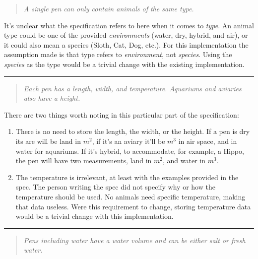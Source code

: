 \documentclass[english,a4paper,]{report}
\begin{document}
\begin{quote}
\emph{A single pen can only contain animals of the same type.}
\end{quote}

It's unclear what the specification refers to here when it comes to
\emph{type}. An animal type could be one of the provided
\emph{environments} (water, dry, hybrid, and air), or it could also mean
a species (Sloth, Cat, Dog, etc.). For this implementation the
assumption made is that type refers to \emph{environment}, not
\emph{species}. Using the \emph{species} as the type would be a trivial
change with the existing implementation.

\begin{center}\rule{0.5\linewidth}{\linethickness}\end{center}

\begin{quote}
\emph{Each pen has a length, width, and temperature. Aquariums and
aviaries also have a height.}
\end{quote}

There are two things worth noting in this particular part of the
specification:

\begin{enumerate}
\def\labelenumi{\arabic{enumi}.}
\item
  There is no need to store the length, the width, or the height. If a
  pen is dry its are will be land in \(m^{2}\), if it's an aviary it'll
  be \(m^{3}\) in air space, and in water for aquariums. If it's hybrid,
  to accommodate, for example, a Hippo, the pen will have two
  measurements, land in \(m^{2}\), and water in \(m^{3}\).
\item
  The temperature is irrelevant, at least with the examples provided in
  the spec. The person writing the spec did not specify why or how the
  temperature should be used. No animals need specific temperature,
  making that data useless. Were this requirement to change, storing
  temperature data would be a trivial change with this implementation.
\end{enumerate}

\begin{center}\rule{0.5\linewidth}{\linethickness}\end{center}

\begin{quote}
\emph{Pens including water have a water volume and can be either salt or
fresh water.}
\end{quote}
\end{document}
